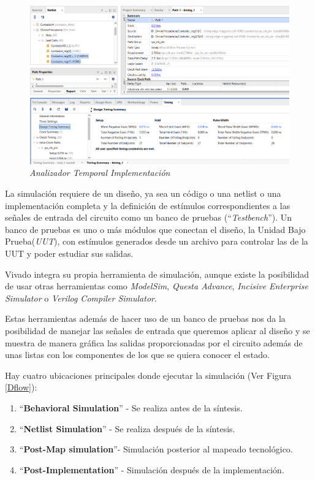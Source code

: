 \begin{figure}[H]
    \centering
    \includegraphics[width = 1\textwidth]{imagenes/rts.png}
    \caption{\textit{Analizador Temporal Implementación}}\label{rts}
\end{figure}

La simulación requiere de un diseño, ya sea un código o una netlist o una implementación completa y la definición de estímulos correspondientes a las 
señales de entrada del circuito como un banco de pruebas (``\textit{Testbench}''). Un banco de pruebas es uno o más módulos que conectan el diseño, 
la Unidad Bajo Prueba(\textit{UUT}), con estímulos generados desde un archivo para controlar las de la UUT y poder estudiar sus salidas.

Vivado integra su propia herramienta de simulación, aunque existe la posibilidad de usar otras herramientas como \textit{ModelSim}, \textit{Questa Advance}, 
\textit{Incisive Enterprise Simulator} o \textit{Verilog Compiler Simulator}.

Estas herramientas además de hacer uso de un banco de pruebas nos da la posibilidad de manejar las señales de entrada que queremos aplicar 
al diseño y se muestra de manera gráfica las salidas proporcionadas por el circuito además de unas listas con los componentes de los que se 
quiera conocer el estado.

\renewcommand{\theenumi}{\Alph{enumi}}

Hay cuatro ubicaciones principales donde ejecutar la simulación (Ver Figura \ref{Dflow}):
\begin{enumerate}
    \item ``\textbf{Behavioral Simulation}'' - Se realiza antes de la síntesis.
    \item ``\textbf{Netlist Simulation}'' - Se realiza después de la síntesis.
    \item ``\textbf{Post-Map simulation}''- Simulación posterior al mapeado tecnológico.
    \item ``\textbf{Post-Implementation}'' - Simulación después de la implementación.
\end{enumerate}


